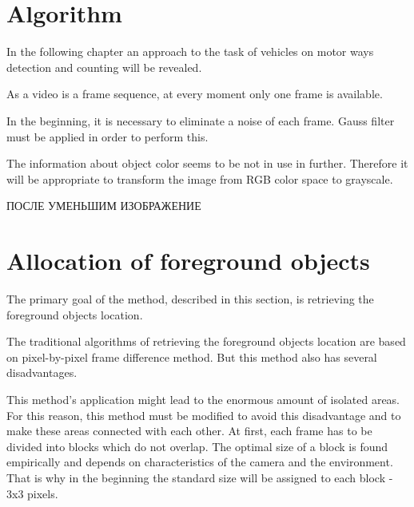 \documentclass[12pt,a4paper,oneside,titlepage]{article}
\begin{document}
\newpage
\section*{Algorithm}

In the following chapter an approach to the task of vehicles on motor ways detection and counting will be revealed.

As a video is a frame sequence, at every moment only one frame is available.

In the beginning, it is necessary to eliminate a noise of each frame.
Gauss filter must be applied in order to perform this.

The information about object color seems to be not in use in further.
Therefore it will be appropriate to transform the image from RGB color space to grayscale.


ПОСЛЕ УМЕНЬШИМ ИЗОБРАЖЕНИЕ

\newpage
\section*{Allocation of foreground objects}
The primary goal of the method, described in this section, is retrieving the foreground objects location.

The traditional algorithms of retrieving the foreground objects location are based on pixel-by-pixel frame difference method.
But this method also has several disadvantages.

This method's application might lead to the  enormous amount of isolated areas.
For this reason, this method must be modified to avoid this disadvantage and to make these areas connected with each other.
At first, each frame has to be divided into blocks which do not overlap.
The optimal size of a block is found empirically and depends on characteristics of the camera and the environment.
That is why in the beginning the standard size will be assigned to each block - 3x3 pixels.
\end{document}
